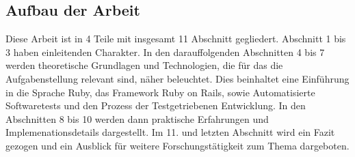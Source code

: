 \subsection{Aufbau der Arbeit}

Diese Arbeit ist in 4 Teile mit insgesamt 11 Abschnitt gegliedert. Abschnitt 1 bis 3 haben einleitenden Charakter. In den darauffolgenden Abschnitten 4 bis 7 werden theoretische Grundlagen und Technologien, die für das die Aufgabenstellung relevant sind, näher beleuchtet. Dies beinhaltet eine Einführung in die Sprache Ruby, das Framework Ruby on Rails, sowie Automatisierte Softwaretests und den Prozess der Testgetriebenen Entwicklung.
In den Abschnitten 8 bis 10 werden dann praktische Erfahrungen und Implemenationsdetails dargestellt. Im 11. und letzten Abschnitt wird ein Fazit gezogen und ein Ausblick für weitere Forschungstätigkeit zum Thema dargeboten.

